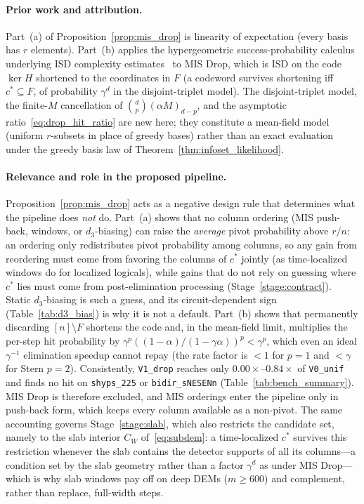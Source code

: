\documentclass[12pt]{article}
\theoremstyle{definition}
\newcommand{\ttt}[1]{\texttt{#1}}
\begin{document}
\paragraph{Prior work and attribution.}
Part~(a) of Proposition~\ref{prop:mis_drop} is linearity of expectation (every basis has $r$ elements). Part~(b)
applies the hypergeometric success-probability calculus underlying ISD complexity
estimates~\cite{Prange1962,Leon1988,Stern1988,CanteautChabaud1998} to MIS Drop, which is ISD on the code $\ker H$
shortened to the coordinates in $F$ (a codeword survives shortening iff $c^* \subseteq F$, of probability
$\gamma^d$ in the disjoint-triplet model). The disjoint-triplet model, the finite-$M$ cancellation of $\binom{d}{p}
(\alpha M)_{d-p}$, and the asymptotic ratio~\eqref{eq:drop_hit_ratio} are new here; they constitute a mean-field
model (uniform $r$-subsets in place of greedy bases) rather than an exact evaluation under the greedy basis law of
Theorem~\ref{thm:infoset_likelihood}.

\paragraph{Relevance and role in the proposed pipeline.}
Proposition~\ref{prop:mis_drop} acts as a negative design rule that determines what the pipeline does \emph{not} do.
Part~(a) shows that no column ordering (MIS push-back, windows, or $d_3$-biasing) can raise the \emph{average} pivot
probability above $r/n$: an ordering only redistributes pivot probability among columns, so any gain from reordering
must come from favoring the columns of $c^*$ jointly (as time-localized windows do for localized logicals), while
gains that do not rely on guessing where $c^*$ lies must come from post-elimination processing
(Stage~\ref{stage:contract}). Static $d_3$-biasing is such a guess, and its circuit-dependent sign
(Table~\ref{tab:d3_bias}) is why it is not a default. Part~(b) shows that permanently discarding $[n] \setminus F$
shortens the code and, in the mean-field limit, multiplies the per-step hit probability by $\gamma^p ((1 - \alpha)/(1
- \gamma\alpha))^p < \gamma^p$, which even an ideal $\gamma^{-1}$ elimination speedup cannot repay (the rate factor
is $< 1$ for $p = 1$ and $< \gamma$ for Stern $p = 2$). Consistently, \ttt{V1\_drop} reaches only
$0.00\times$--$0.84\times$ of \ttt{V0\_unif} and finds no hit on \ttt{shyps\_225} or \ttt{bidir\_sNESENn}
(Table~\ref{tab:bench_summary}). MIS Drop is therefore excluded, and MIS orderings enter the pipeline only in
push-back form, which keeps every column available as a non-pivot. The same accounting governs
Stage~\ref{stage:slab}, which also restricts the candidate set, namely to the slab interior $C_W$
of~\eqref{eq:subdem}: a time-localized $c^*$ survives this restriction whenever the slab contains the detector
supports of all its columns---a condition set by the slab geometry rather than a factor $\gamma^d$ as under MIS
Drop---which is why slab windows pay off on deep DEMs ($m \ge 600$) and complement, rather than replace, full-width
steps.
\end{document}
